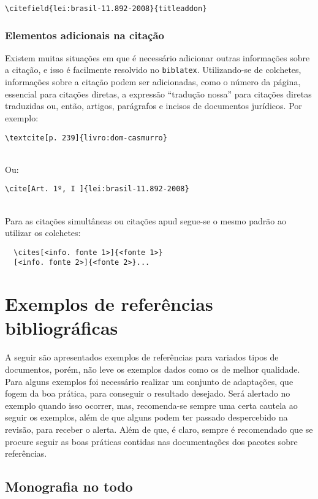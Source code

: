 \verb|\citefield{lei:brasil-11.892-2008}{titleaddon}|


\subsubsection{Elementos adicionais na citação}
Existem muitas situações em que é necessário adicionar outras informações sobre a citação, e isso é facilmente resolvido no \verb|biblatex|. Utilizando-se de colchetes, informações sobre a citação podem ser adicionadas, como o número da página, essencial para citações diretas, a expressão ``tradução nossa'' para citações diretas traduzidas ou, então, artigos, parágrafos e incisos de documentos jurídicos. Por exemplo:

\verb|\textcite[p. 239]{livro:dom-casmurro}|

\textcite[p. 239]{livro:dom-casmurro}\\

Ou:

\verb|\cite[Art. 1º, I ]{lei:brasil-11.892-2008}|

\cite[Art. 1º, I ]{lei:brasil-11.892-2008}\\

Para as citações simultâneas ou citações apud segue-se o mesmo padrão ao utilizar os colchetes: %
\begin{verbatim}
  \cites[<info. fonte 1>]{<fonte 1>}
  [<info. fonte 2>]{<fonte 2>}...
\end{verbatim}

\section{Exemplos de referências bibliográficas}
A seguir são apresentados exemplos de referências para variados tipos de documentos, porém, não leve os exemplos dados como os de melhor qualidade. Para alguns exemplos foi necessário realizar um conjunto de adaptações, que fogem da boa prática, para conseguir o resultado desejado. Será alertado no exemplo quando isso ocorrer, mas, recomenda-se sempre uma certa cautela ao seguir os exemplos, além de que alguns podem ter passado despercebido na revisão, para receber o alerta. Além de que, é claro, sempre é recomendado que se procure seguir as boas práticas contidas nas documentações dos pacotes sobre referências.

\subsection{Monografia no todo}
